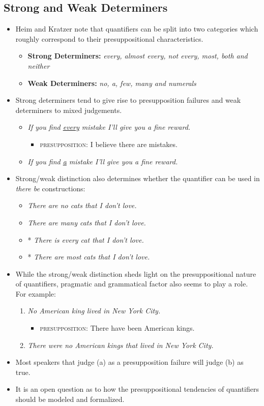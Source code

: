 \documentclass[a4paper]{article}
\begin{document}
\subsection{Strong and Weak Determiners}
\begin{itemize}
\item Heim and Kratzer note that quantifiers can be split into two categories which roughly correspond to their presuppositional characteristics.
\begin{itemize}
\item \textbf{Strong Determiners:} \emph{every, almost every, not every, most, both and neither}
\item \textbf{Weak Determiners:} \emph{no, a, few, many and numerals}
\end{itemize}
\item Strong determiners tend to give rise to presupposition failures and weak determiners to mixed judgements.
\begin{itemize}
	\item \emph{If you find \underline{every} mistake I'll give you a fine reward.}
\begin{itemize}
\item \textsc{presupposition:} I believe there are mistakes.
\end{itemize}
	\item \emph{If you find \underline{a} mistake I'll give you a fine reward.}
\end{itemize}
\item Strong/weak distinction also determines whether the quantifier can be used in \emph{there be} constructions:
\begin{itemize}
\item \emph{There are no cats that I don't love.}
\item \emph{There are many cats that I don't love.}
\item * \emph{There is every cat that I don't love.}
\item * \emph{There are most cats that I don't love.}
\end{itemize}
\item While the strong/weak distinction sheds light on the presuppositional nature of quantifiers, pragmatic and grammatical factor also seems to play a role. For example:
  \begin{enumerate}
  \item \emph{No American king lived in New York City.}
    \begin{itemize}
    \item \textsc{presupposition:} There have been American kings.
    \end{itemize}
  \item \emph{There were no American kings that lived in New York City.}
  \end{enumerate}
\item Most speakers that judge (a) as a presupposition failure will judge (b) as true.
\item It is an open question as to how the presuppositional tendencies of quantifiers should be modeled and formalized.
\end{itemize}
\end{document}
